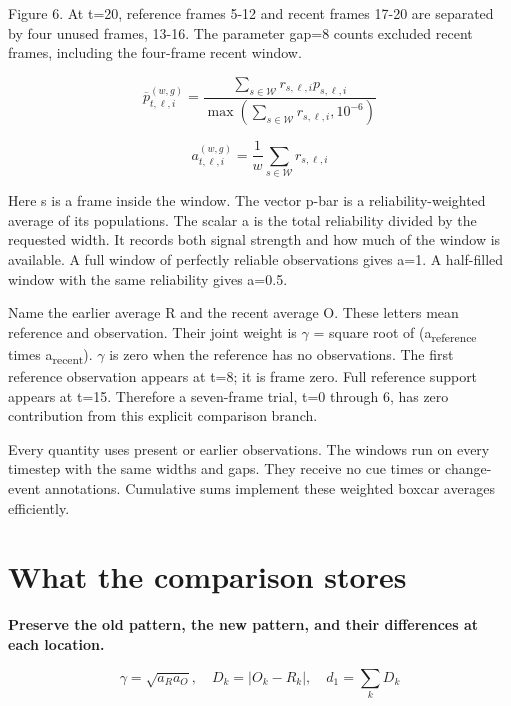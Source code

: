 \documentclass[11pt,letterpaper]{article}
\begin{document}
{
\small\color{muted} Figure 6. At t=20, reference frames 5-12 and recent frames 17-20 are separated by four unused frames, 13-16. The parameter gap=8 counts excluded recent frames, including the four-frame recent window.\par}


\begin{equation}\overline p_{t,\ell,i}^{(w,g)}=\frac{\sum_{s\in\mathcal W}r_{s,\ell,i}p_{s,\ell,i}}{\max(\sum_{s\in\mathcal W}r_{s,\ell,i},10^{-6})}\end{equation}

\begin{equation}a_{t,\ell,i}^{(w,g)}=\frac1w\sum_{s\in\mathcal W}r_{s,\ell,i}\end{equation}

Here s is a frame inside the window. The vector p-bar is a reliability-weighted average of its populations. The scalar a is the total reliability divided by the requested width. It records both signal strength and how much of the window is available. A full window of perfectly reliable observations gives a=1. A half-filled window with the same reliability gives a=0.5.


Name the earlier average R and the recent average O. These letters mean reference and observation. Their joint weight is \(\gamma\) = square root of (a\textsubscript{reference} times a\textsubscript{recent}). \(\gamma\) is zero when the reference has no observations. The first reference observation appears at t=8; it is frame zero. Full reference support appears at t=15. Therefore a seven-frame trial, t=0 through 6, has zero contribution from this explicit comparison branch.


Every quantity uses present or earlier observations. The windows run on every timestep with the same widths and gaps. They receive no cue times or change-event annotations. Cumulative sums implement these weighted boxcar averages efficiently.


\clearpage

\section{What the comparison stores}\label{sec13}

\textbf{Preserve the old pattern, the new pattern, and their differences at each location.}


\begin{equation}\gamma=\sqrt{a_Ra_O},\quad D_k=|O_k-R_k|,\quad d_1=\sum_kD_k\end{equation}
\end{document}
